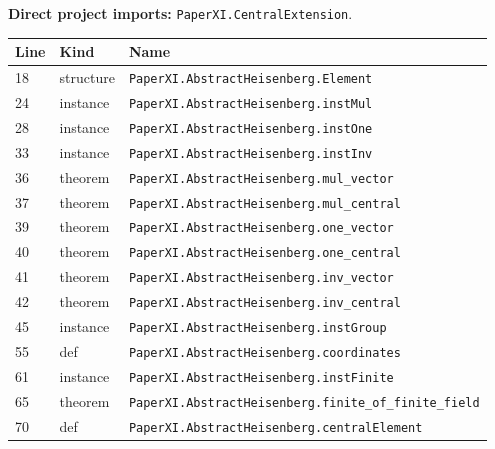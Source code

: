 \documentclass[10pt,oneside]{book}
\begin{document}

\textbf{Direct project imports:} \nolinkurl{PaperXI.CentralExtension}.

\begin{longtable}{@{}p{}p{}p{}@{}}\toprule Line&Kind&Name\\\midrule\endhead

18&structure&\nolinkurl{PaperXI.AbstractHeisenberg.Element}\\

24&instance&\nolinkurl{PaperXI.AbstractHeisenberg.instMul}\\

28&instance&\nolinkurl{PaperXI.AbstractHeisenberg.instOne}\\

33&instance&\nolinkurl{PaperXI.AbstractHeisenberg.instInv}\\

36&theorem&\nolinkurl{PaperXI.AbstractHeisenberg.mul_vector}\\

37&theorem&\nolinkurl{PaperXI.AbstractHeisenberg.mul_central}\\

39&theorem&\nolinkurl{PaperXI.AbstractHeisenberg.one_vector}\\

40&theorem&\nolinkurl{PaperXI.AbstractHeisenberg.one_central}\\

41&theorem&\nolinkurl{PaperXI.AbstractHeisenberg.inv_vector}\\

42&theorem&\nolinkurl{PaperXI.AbstractHeisenberg.inv_central}\\

45&instance&\nolinkurl{PaperXI.AbstractHeisenberg.instGroup}\\

55&def&\nolinkurl{PaperXI.AbstractHeisenberg.coordinates}\\

61&instance&\nolinkurl{PaperXI.AbstractHeisenberg.instFinite}\\

65&theorem&\nolinkurl{PaperXI.AbstractHeisenberg.finite_of_finite_field}\\

70&def&\nolinkurl{PaperXI.AbstractHeisenberg.centralElement}\\


\end{longtable}
\end{document}

